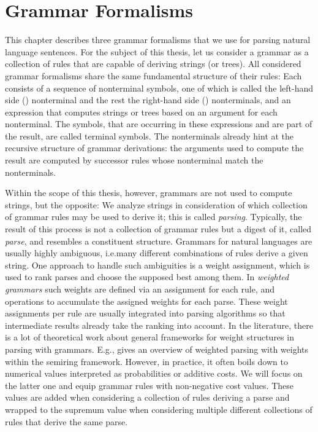 \documentclass[../document.tex]{subfiles}
\begin{document}
    \chapter{Grammar Formalisms}
    This chapter describes three grammar formalisms that we use for parsing natural language sentences.
    For the subject of this thesis, let us consider a grammar as a collection of rules that are capable of deriving strings (or trees).
    All considered grammar formalisms share the same fundamental structure of their rules:
        Each consists of a sequence of nonterminal symbols, one of which is called the left-hand side () nonterminal and the rest the right-hand side () nonterminals, and an expression that computes strings or trees based on an argument for each  nonterminal.
        The symbols, that are occurring in these expressions and are part of the result, are called terminal symbols.
    The nonterminals already hint at the recursive structure of grammar derivations: the arguments used to compute the result are computed by successor rules whose  nonterminal match the  nonterminals.

    Within the scope of this thesis, however, grammars are not used to compute strings, but the opposite:
        We analyze strings in consideration of which collection of grammar rules may be used to derive it; this is called \emph{parsing}.
    Typically, the result of this process is not a collection of grammar rules but a digest of it, called \emph{parse}, and resembles a constituent structure.
    Grammars for natural languages are usually highly ambiguous, i.e.\@ many different combinations of rules derive a given string.
    One approach to handle such ambiguities is a weight assignment, which is used to rank parses and choose the supposed best among them.
    In \emph{weighted grammars} such weights are defined via an assignment for each rule, and operations to accumulate the assigned weights for each parse.
    These weight assignments per rule are usually integrated into parsing algorithms so that intermediate results already take the ranking into account.
    In the literature, there is a lot of theoretical work about general frameworks for weight structures in parsing with grammars.
    E.g., \citet{Goodman} gives an overview of weighted parsing with weights within the semiring framework.
    However, in practice, it often boils down to numerical values interpreted as probabilities or additive costs.
    We will focus on the latter one and equip grammar rules with non-negative cost values.
    These values are added when considering a collection of rules deriving a parse and wrapped to the supremum value when considering multiple different collections of rules that derive the same parse.
\end{document}
